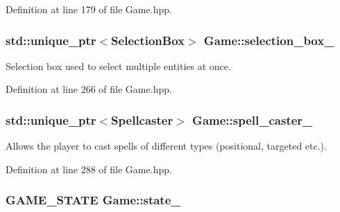 Definition at line 179 of file Game.\+hpp.

\subsubsection[{\texorpdfstring{selection\+\_\+box\+\_\+}{selection_box_}}]{\setlength{\rightskip}{0pt plus 5cm}std\+::unique\+\_\+ptr$<${\bf Selection\+Box}$>$ Game\+::selection\+\_\+box\+\_\+\hspace{0.3cm}{\ttfamily [private]}}\hypertarget{class_game_af49a6f70e2392c419e0bbc6157b809a4}{}\label{class_game_af49a6f70e2392c419e0bbc6157b809a4}


Selection box used to select multiple entities at once. 



Definition at line 266 of file Game.\+hpp.

\subsubsection[{\texorpdfstring{spell\+\_\+caster\+\_\+}{spell_caster_}}]{\setlength{\rightskip}{0pt plus 5cm}std\+::unique\+\_\+ptr$<${\bf Spellcaster}$>$ Game\+::spell\+\_\+caster\+\_\+\hspace{0.3cm}{\ttfamily [private]}}\hypertarget{class_game_a16f63fa6189119f189b90129558af639}{}\label{class_game_a16f63fa6189119f189b90129558af639}


Allows the player to cast spells of different types (positional, targeted etc.). 



Definition at line 288 of file Game.\+hpp.

\subsubsection[{\texorpdfstring{state\+\_\+}{state_}}]{\setlength{\rightskip}{0pt plus 5cm}G\+A\+M\+E\+\_\+\+S\+T\+A\+TE Game\+::state\+\_\+\hspace{0.3cm}{\ttfamily [private]}}\hypertarget{class_game_ab0c5032f689e8e704086a83bf57e3f26}{}\label{class_game_ab0c5032f689e8e704086a83bf57e3f26}


